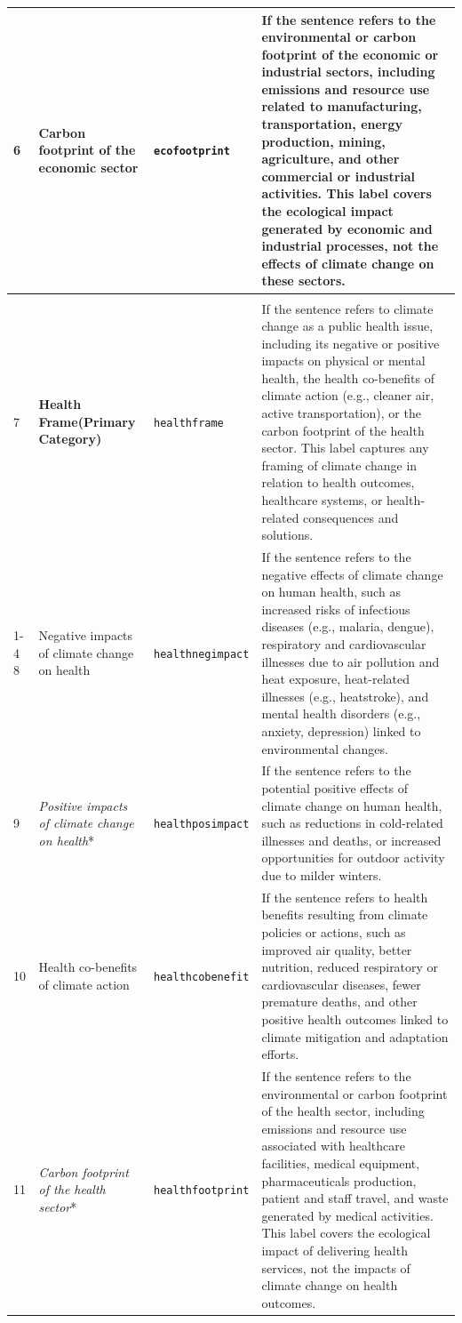 \documentclass[12pt]{article}
\renewcommand\_{\texttt{\detokenize{_}\allowbreak}}
\begin{document}
{\begin{longtable}{p{0.5cm}p{4.5cm}p{2.8cm}p{13.5cm}}
6 & Carbon footprint of the economic sector & \texttt{eco\_footprint} & If the sentence refers to the environmental or carbon footprint of the economic or industrial sectors, including emissions and resource use related to manufacturing, transportation, energy production, mining, agriculture, and other commercial or industrial activities. This label covers the ecological impact generated by economic and industrial processes, not the effects of climate change on these sectors. \\
\midrule
\rowcolor{gray!8}
\multicolumn{4}{l}{\textit{Health Frame}} \\
\midrule
7 & \textbf{Health Frame\newline (Primary Category)} & \texttt{health\_frame} & If the sentence refers to climate change as a public health issue, including its negative or positive impacts on physical or mental health, the health co-benefits of climate action (e.g., cleaner air, active transportation), or the carbon footprint of the health sector. This label captures any framing of climate change in relation to health outcomes, healthcare systems, or health-related consequences and solutions. \\
\cmidrule(lr){1-4}
8 & Negative impacts of climate change on health & \texttt{health\_neg\_impact} & If the sentence refers to the negative effects of climate change on human health, such as increased risks of infectious diseases (e.g., malaria, dengue), respiratory and cardiovascular illnesses due to air pollution and heat exposure, heat-related illnesses (e.g., heatstroke), and mental health disorders (e.g., anxiety, depression) linked to environmental changes. \\
9 & \textit{Positive impacts of climate change on health}* & \texttt{health\_pos\_impact} & If the sentence refers to the potential positive effects of climate change on human health, such as reductions in cold-related illnesses and deaths, or increased opportunities for outdoor activity due to milder winters. \\
10 & Health co-benefits of climate action & \texttt{health\_cobenefit} & If the sentence refers to health benefits resulting from climate policies or actions, such as improved air quality, better nutrition, reduced respiratory or cardiovascular diseases, fewer premature deaths, and other positive health outcomes linked to climate mitigation and adaptation efforts. \\
11 & \textit{Carbon footprint of the health sector}* & \texttt{health\_footprint} & If the sentence refers to the environmental or carbon footprint of the health sector, including emissions and resource use associated with healthcare facilities, medical equipment, pharmaceuticals production, patient and staff travel, and waste generated by medical activities. This label covers the ecological impact of delivering health services, not the impacts of climate change on health outcomes. \\

\end{longtable}}
\end{document}
